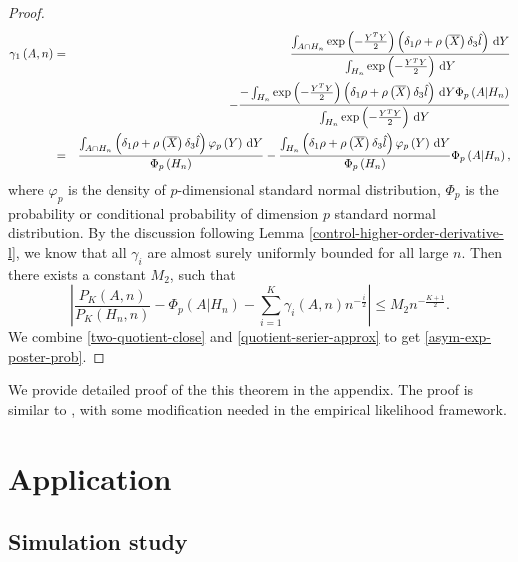 \begin{thm}
\begin{proof}
\begin{eqnarray*}
\gamma_{1}\left(A,n\right) & = & \frac{\int_{A\cap H_{n}}\exp\left(-\frac{Y^{T}Y}{2}\right)\left(\delta_{1}\rho+\rho\left(\overline{X}\right)\delta_{3}\hat{l}\right)\,\mathrm{d} Y}{\int_{H_{n}}\exp\left(-\frac{Y^{T}Y}{2}\right)\,\mathrm{d} Y}\\
 &  & -\frac{-\int_{H_{n}}\exp\left(-\frac{Y^{T}Y}{2}\right)\left(\delta_{1}\rho+\rho\left(\overline{X}\right)\delta_{3}\hat{l}\right)\,\mathrm{d} Y\Phi_{p}\left(A|H_{n}\right)}{\int_{H_{n}}\exp\left(-\frac{Y^{T}Y}{2}\right)\,\mathrm{d} Y}\\
 & = & \frac{\int_{A\cap H_{n}}\left(\delta_{1}\rho+\rho\left(\overline{X}\right)\delta_{3}\hat{l}\right)\varphi_{p}\left(Y\right)\,\mathrm{d} Y}{\Phi_{p}\left(H_{n}\right)}-\frac{\int_{H_{n}}\left(\delta_{1}\rho+\rho\left(\overline{X}\right)\delta_{3}\hat{l}\right)\varphi_{p}\left(Y\right)\,\mathrm{d} Y}{\Phi_{p}\left(H_{n}\right)}\Phi_{p}\left(A|H_{n}\right),
\end{eqnarray*}
where $\varphi_{p}$ is the density of  $p$-dimensional standard normal
distribution, $\Phi_{p}$ is the probability or conditional probability
of dimension $p$ standard normal distribution. By the discussion
following Lemma \ref{control-higher-order-derivative-l}, we know that
all $\gamma_{i}$ are almost surely uniformly bounded for all large
$n$. Then there exists a constant $M_{2}$, such that 
\begin{equation}
\left|\frac{P_{K}\left(A,n\right)}{P_{K}\left(H_{n},n\right)}-\Phi_{p}\left(A|H_{n}\right)-\sum_{i=1}^{K}\gamma_{i}\left(A,n\right)n^{-\frac{i}{2}}\right|\le M_{2}n^{-\frac{K+1}{2}}.\label{eq:quotient-serier-approx}
\end{equation}
We combine \ref{two-quotient-close} and \ref{quotient-serier-approx}
to get \eqref{asym-exp-poster-prob}.
\end{proof}
\end{thm}
We provide detailed proof of the this theorem in the appendix. The proof
is similar to \citet{johnson1970asymptotic}, with some modification
needed in the empirical likelihood framework. 
\begin{cor}

\end{cor}

\section{Application\label{sec:application}}


\subsection{Simulation study}

